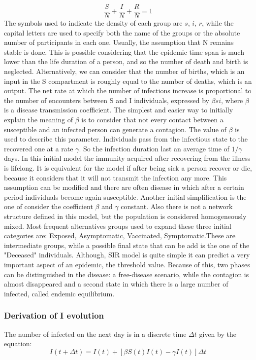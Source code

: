 \begin{equation}
	\frac{S}{N} + \frac{I}{N} + \frac{R}{N} = 1 
\end{equation}
The symbols used to indicate the density of each group are $s$, $i$, $r$, while the capital letters are used to specify both the name of the groups or the absolute number of participants in each one. 
Usually, the assumption that N remains stable is done. This is possible considering that the epidemic time span is much lower than the life duration of a person, and so the number of death and birth is neglected. Alternatively, we can consider that the number of births, which is an input in the S compartment is roughly equal to the number of deaths, which is an output. 
The net rate at which the number of infections increase is proportional to the number of encounters between S and I individuals, expressed by $ \beta s i $, where $\beta$ is a disease transmission coefficient. The simplest and easier way to initially explain the meaning of $\beta$ is to consider that not every contact between a susceptible and an infected person can generate a contagion. The value of $\beta$ is used to describe this parameter. 
Individuals pass from the infectious state to the recovered one at a rate $\gamma$. So the infection duration last an average time of $1/\gamma$ days. 
 In this initial model the immunity acquired after recovering from the illness is lifelong. It is equivalent for the model if after being sick a person recover or die, because it considers that it will not transmit the infection any more.  This assumption can be modified and there are often disease in which after a certain period individuals become again susceptible. Another initial simplification is the one of consider the coefficient $\beta$ and $\gamma$ constant. Also there is not a network structure defined in this model, but the population is considered homogeneously mixed. 
Most frequent alternatives groups used to expand these three initial categories are: Exposed, Asymptomatic, Vaccinated, Symptomatic.These are intermediate groups, while a possible final state that can be add is the one of the "Deceased" individuals.   
Although, SIR model is quite simple it can predict a very important aspect of an epidemic, the threshold value. Because of this, two phases can be distinguished in the disease: a free-disease scenario, while the contagion is almost disappeared and a second state in which there is a large number of infected, called endemic equilibrium.

\subsubsection{Derivation of I evolution}
The number of infected on the next day is in a discrete time $\Delta t$ given by the equation:
\begin{equation}
	I(t+\Delta t) = I(t) + [\beta S(t)I(t) - \gamma I(t)]\Delta t
\end{equation}

